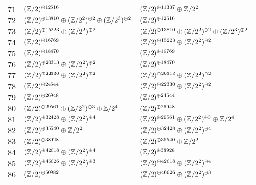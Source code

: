 \begin{supertabular}{|c|p{5.5cm}|p{5.5cm}|}
$71$%
&$(\mathbb{Z}/2)^{\oplus12516}$%
&$(\mathbb{Z}/2)^{\oplus11337}\oplus\mathbb{Z}/2^{2}$\\

$72$%
&$(\mathbb{Z}/2)^{\oplus13810}\oplus(\mathbb{Z}/2^{2})^{\oplus2}\oplus(\mathbb{Z}/2^{3})^{\oplus2}$%
&$(\mathbb{Z}/2)^{\oplus12516}$\\

$73$%
&$(\mathbb{Z}/2)^{\oplus15223}\oplus(\mathbb{Z}/2^{2})^{\oplus2}$%
&$(\mathbb{Z}/2)^{\oplus13810}\oplus(\mathbb{Z}/2^{2})^{\oplus2}\oplus(\mathbb{Z}/2^{3})^{\oplus2}$\\

$74$%
&$(\mathbb{Z}/2)^{\oplus16769}$%
&$(\mathbb{Z}/2)^{\oplus15223}\oplus(\mathbb{Z}/2^{2})^{\oplus2}$\\

$75$%
&$(\mathbb{Z}/2)^{\oplus18470}$%
&$(\mathbb{Z}/2)^{\oplus16769}$\\

$76$%
&$(\mathbb{Z}/2)^{\oplus20313}\oplus(\mathbb{Z}/2^{2})^{\oplus2}$%
&$(\mathbb{Z}/2)^{\oplus18470}$\\

$77$%
&$(\mathbb{Z}/2)^{\oplus22330}\oplus(\mathbb{Z}/2^{2})^{\oplus2}$%
&$(\mathbb{Z}/2)^{\oplus20313}\oplus(\mathbb{Z}/2^{2})^{\oplus2}$\\

$78$%
&$(\mathbb{Z}/2)^{\oplus24544}$%
&$(\mathbb{Z}/2)^{\oplus22330}\oplus(\mathbb{Z}/2^{2})^{\oplus2}$\\

$79$%
&$(\mathbb{Z}/2)^{\oplus26948}$%
&$(\mathbb{Z}/2)^{\oplus24544}$\\

$80$%
&$(\mathbb{Z}/2)^{\oplus29561}\oplus(\mathbb{Z}/2^{2})^{\oplus3}\oplus\mathbb{Z}/2^{4}$%
&$(\mathbb{Z}/2)^{\oplus26948}$\\

$81$%
&$(\mathbb{Z}/2)^{\oplus32428}\oplus(\mathbb{Z}/2^{2})^{\oplus4}$%
&$(\mathbb{Z}/2)^{\oplus29561}\oplus(\mathbb{Z}/2^{2})^{\oplus3}\oplus\mathbb{Z}/2^{4}$\\

$82$%
&$(\mathbb{Z}/2)^{\oplus35540}\oplus\mathbb{Z}/2^{2}$%
&$(\mathbb{Z}/2)^{\oplus32428}\oplus(\mathbb{Z}/2^{2})^{\oplus4}$\\

$83$%
&$(\mathbb{Z}/2)^{\oplus38928}$%
&$(\mathbb{Z}/2)^{\oplus35540}\oplus\mathbb{Z}/2^{2}$\\

$84$%
&$(\mathbb{Z}/2)^{\oplus42618}\oplus(\mathbb{Z}/2^{2})^{\oplus4}$%
&$(\mathbb{Z}/2)^{\oplus38928}$\\

$85$%
&$(\mathbb{Z}/2)^{\oplus46626}\oplus(\mathbb{Z}/2^{2})^{\oplus3}$%
&$(\mathbb{Z}/2)^{\oplus42618}\oplus(\mathbb{Z}/2^{2})^{\oplus4}$\\

$86$%
&$(\mathbb{Z}/2)^{\oplus50982}$%
&$(\mathbb{Z}/2)^{\oplus46626}\oplus(\mathbb{Z}/2^{2})^{\oplus3}$\\


\end{supertabular}
